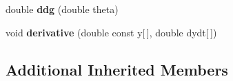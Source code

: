 \begin{DoxyCompactItemize}
\item 
\hypertarget{classstudy_1_1_deterministic___network___s_i_r___sim_a9c8aadae9ff4ac9577f032bb8d44b6bb}{double {\bfseries ddg} (double theta)}\label{classstudy_1_1_deterministic___network___s_i_r___sim_a9c8aadae9ff4ac9577f032bb8d44b6bb}

\item 
\hypertarget{classstudy_1_1_deterministic___network___s_i_r___sim_a82fbc2bcd3c9fb74d8ae35dba580e9b0}{void {\bfseries derivative} (double const y\mbox{[}$\,$\mbox{]}, double dydt\mbox{[}$\,$\mbox{]})}\label{classstudy_1_1_deterministic___network___s_i_r___sim_a82fbc2bcd3c9fb74d8ae35dba580e9b0}

\end{DoxyCompactItemize}
\subsection*{Additional Inherited Members}
